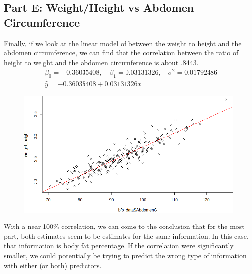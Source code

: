 \documentclass[a4paper, 11pt]{article}
\begin{document}
\subsection*{Part E: Weight/Height vs Abdomen Circumference}
Finally, if we look at the linear model of between the weight to height and the abdomen circumference, we can find that the correlation between the ratio of height to weight and the abdomen circumference is about .8443.
\begin{align*}
	&\beta_0 = -0.36035408,\quad \beta_1 = 0.03131326 ,\quad \sigma^2 =  0.01792486 \\
	&\hat{y} = -0.36035408 + 0.03131326 x
\end{align*}
\begin{figure}[H]
	\centering
	\includegraphics[scale=0.65]{ab_np_plot.png}
\end{figure}
With a near 100\% correlation, we can come to the conclusion that for the most part, both estimates seem to be estimates for the same information. In this case, that information is body fat percentage. If the correlation were significantly smaller, we could potentially be trying to predict the wrong type of information with either (or both) predictors.




% 
\end{document}

